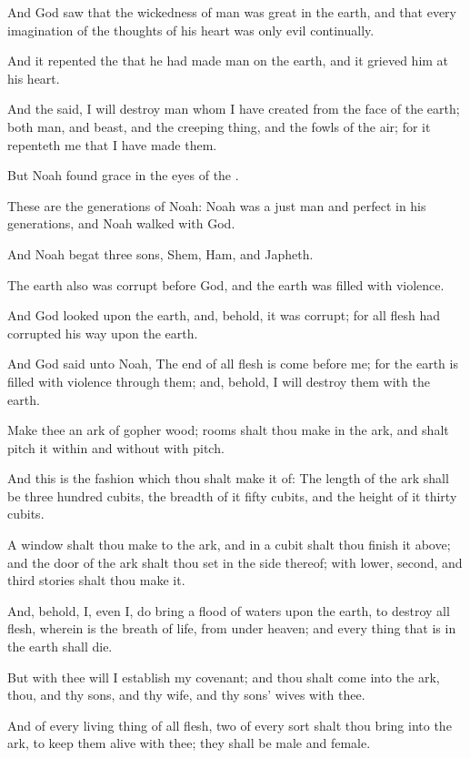 \Verse And God saw that the wickedness of man was great in the earth, and that every imagination of the thoughts of his heart was only evil continually.

\Verse And it repented the \LORD that he had made man on the earth, and it grieved him at his heart.

\Verse And the \LORD said, I will destroy man whom I have created from the face of the earth; both man, and beast, and the creeping thing, and the fowls of the air; for it repenteth me that I have made them.

\Verse But Noah found grace in the eyes of the \LORD.

\Verse These are the generations of Noah: Noah was a just man and perfect in his generations, and Noah walked with God.

\Verse And Noah begat three sons, Shem, Ham, and Japheth.

\Verse The earth also was corrupt before God, and the earth was filled with violence.

\Verse And God looked upon the earth, and, behold, it was corrupt; for all flesh had corrupted his way upon the earth.

\Verse And God said unto Noah, The end of all flesh is come before me; for the earth is filled with violence through them; and, behold, I will destroy them with the earth.

\Verse Make thee an ark of gopher wood; rooms shalt thou make in the ark, and shalt pitch it within and without with pitch.

\Verse And this is the fashion which thou shalt make it of: The length of the ark shall be three hundred cubits, the breadth of it fifty cubits, and the height of it thirty cubits.

\Verse A window shalt thou make to the ark, and in a cubit shalt thou finish it above; and the door of the ark shalt thou set in the side thereof; with lower, second, and third stories shalt thou make it.

\Verse And, behold, I, even I, do bring a flood of waters upon the earth, to destroy all flesh, wherein is the breath of life, from under heaven; and every thing that is in the earth shall die.

\Verse But with thee will I establish my covenant; and thou shalt come into the ark, thou, and thy sons, and thy wife, and thy sons' wives with thee.

\Verse And of every living thing of all flesh, two of every sort shalt thou bring into the ark, to keep them alive with thee; they shall be male and female.

